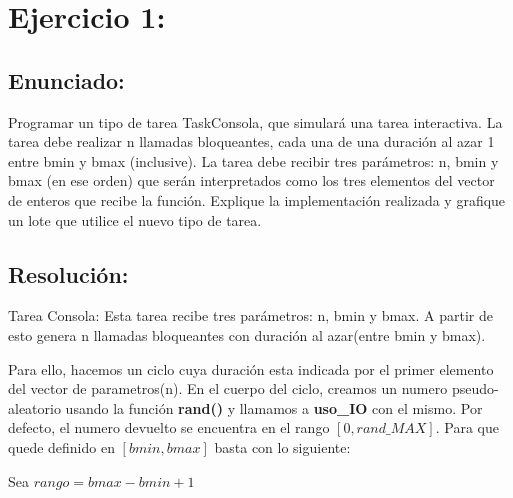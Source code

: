 \documentclass[10pt, a4paper]{article}
\author{Sistemas Operativos, DC, UBA.}
\date{}
\title{}
\begin{document}
	
	
	
	
	\maketitle
	\tableofcontents
	
	\pagebreak

\section{Ejercicio 1:}



\subsection{Enunciado:}
Programar un tipo de tarea TaskConsola, que simulará una tarea interactiva.
La tarea debe realizar n llamadas bloqueantes, cada una de una duración al azar 1 entre bmin
y bmax (inclusive). La tarea debe recibir tres parámetros: n, bmin y bmax (en ese orden)
que serán interpretados como los tres elementos del vector de enteros que recibe la función.
Explique la implementación realizada y grafique un lote que utilice el nuevo tipo de tarea.

\subsection{Resolución:}
Tarea Consola: Esta tarea recibe tres parámetros: n, bmin y bmax. A partir de esto genera n llamadas bloqueantes con duración al azar(entre bmin y bmax).

Para ello, hacemos un ciclo cuya duración esta indicada por el primer elemento del vector de parametros(n).
En el cuerpo del ciclo, creamos un numero pseudo-aleatorio usando la función \textbf{rand()} y llamamos a \textbf{uso\_IO} con el mismo.
Por defecto, el numero devuelto se encuentra en el rango $[0,rand\_MAX]$. Para que quede definido en $[bmin,bmax]$ basta con lo siguiente:

Sea $rango = bmax - bmin + 1 $
\end{document}
